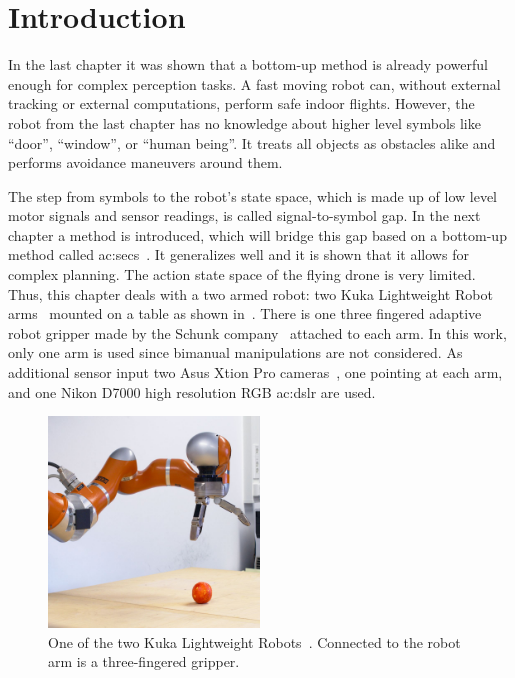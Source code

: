 \section{Introduction}
\label{sec:action_actioncategories}

In the last chapter it was shown that a bottom-up method is already powerful enough for complex perception tasks.
A fast moving robot can, without external tracking or external computations, perform safe indoor flights.
However, the robot from the last chapter has no knowledge about higher level symbols like ``door'', ``window'', or ``human being''.
It treats all objects as obstacles alike and performs avoidance maneuvers around them.

The step from symbols to the robot's state space, which is made up of low level motor signals and sensor readings, is called signal-to-symbol gap.
In the next chapter a method is introduced, which will bridge this gap based on a bottom-up method called \glspl{ac:sec}~\cite{aksoy2011learning, aksoydellentamosiunaite2011}.
It generalizes well and it is shown that it allows for complex planning.
The action state space of the flying drone is very limited.
Thus, this chapter deals with a two armed robot: two Kuka Lightweight Robot arms~\cite{bischoff2010kukadlr} mounted on a table as shown in~.
There is one three fingered adaptive robot gripper made by the Schunk company~\cite{schunk2018} attached to each arm.
In this work, only one arm is used since bimanual manipulations are not considered.
As additional sensor input two Asus Xtion Pro cameras~\cite{haggag2013measuring}, one pointing at each arm, and one Nikon D7000 high resolution RGB \gls{ac:dslr} are used.

\begin{figure}
  \centering
  \includegraphics[width=0.5\textwidth]{./figures/sec/kuka.jpg}
  \caption{One of the two Kuka Lightweight Robots~\cite{bischoff2010kukadlr}. Connected to the robot arm is a three-fingered gripper.}
  \label{fig:sec_introduction_kuka}
\end{figure}

